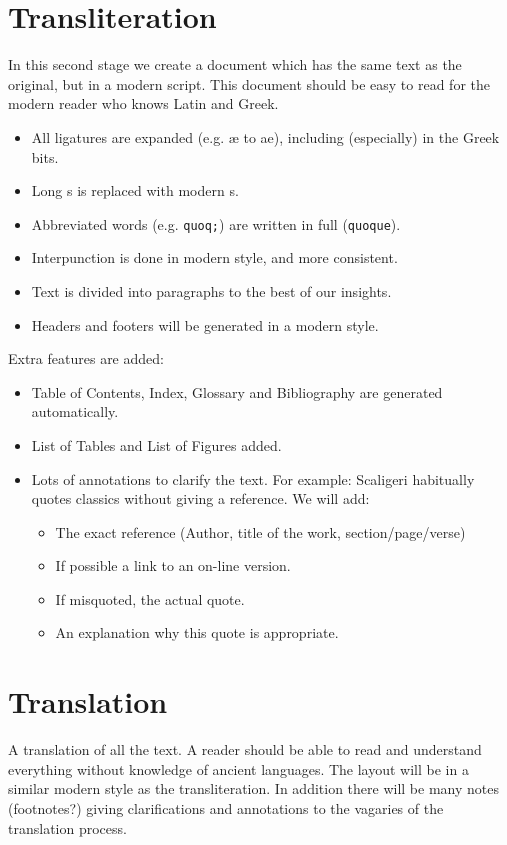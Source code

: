 \documentclass{report}
\begin{document}
\section{Transliteration}
In this second stage we create a document which has the same text as the original, but in a modern script.
This document should be easy to read for the modern reader who knows Latin and Greek.
\begin{itemize}
\item All ligatures are expanded (e.g. æ to ae), including (especially) in the Greek bits.
\item Long s is replaced with modern s.
\item Abbreviated words (e.g. \verb+quoq;+) are written in full (\verb+quoque+).
\item Interpunction is done in modern style, and more consistent.
\item Text is divided into paragraphs to the best of our insights.
\item Headers and footers will be generated in a modern style.
\end{itemize}
Extra features are added:
\begin{itemize}
\item Table of Contents, Index, Glossary and Bibliography are generated automatically.
\item List of Tables and List of Figures added.
\item Lots of annotations to clarify the text. For example: Scaligeri habitually quotes classics without giving a reference.
We will add:
    \begin{itemize}
    \item The exact reference (Author, title of the work, section/page/verse)
    \item If possible a link to an on-line version.
    \item If misquoted, the actual quote.
    \item An explanation why this quote is appropriate.
    \end{itemize}
\end{itemize}


\section{Translation}
A translation of all the text. A reader should be able to read and understand everything without knowledge of ancient
languages. The layout will be in a similar modern style as the transliteration. In addition there will be many notes 
(footnotes?) giving clarifications and annotations to the vagaries of the translation process.
\end{document}
